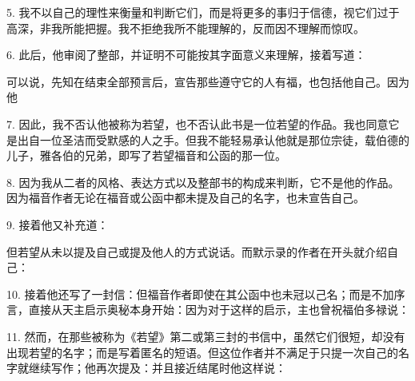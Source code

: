 5. 我不以自己的理性来衡量和判断它们，而是将更多的事归于信德，视它们过于高深，非我所能把握。我不拒绝我所不能理解的，反而因不理解而惊叹。\par

6. 此后，他审阅了整部，并证明不可能按其字面意义来理解，接着写道：\par

可以说，先知在结束全部预言后，宣告那些遵守它的人有福，也包括他自己。因为他\par

7. 因此，我不否认他被称为若望，也不否认此书是一位若望的作品。我也同意它是出自一位圣洁而受默感的人之手。但我不能轻易承认他就是那位宗徒，载伯德的儿子，雅各伯的兄弟，即写了若望福音和公函的那一位。\par

8. 因为我从二者的风格、表达方式以及整部书的构成来判断，它不是他的作品。因为福音作者无论在福音或公函中都未提及自己的名字，也未宣告自己。\par

9. 接着他又补充道：\par

但若望从未以提及自己或提及他人的方式说话。而默示录的作者在开头就介绍自己：\par

10. 接着他还写了一封信：但福音作者即使在其公函中也未冠以己名；而是不加序言，直接从天主启示奥秘本身开始：因为对于这样的启示，主也曾祝福伯多禄说：\par

11. 然而，在那些被称为《若望》第二或第三封的书信中，虽然它们很短，却没有出现若望的名字；而是写着匿名的短语。但这位作者并不满足于只提一次自己的名字就继续写作；他再次提及：并且接近结尾时他这样说：\par

